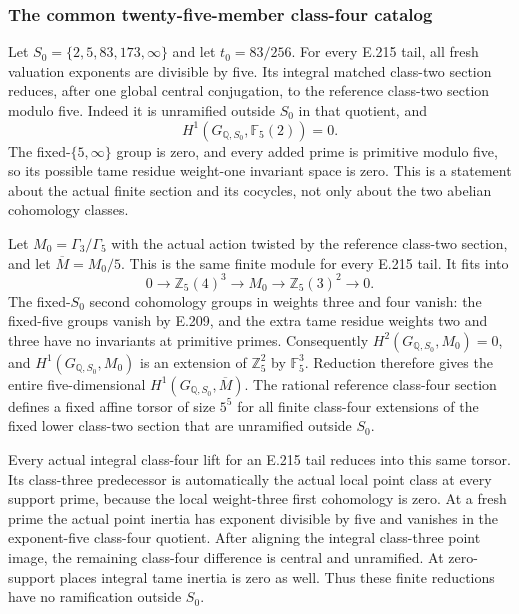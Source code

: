 
\subsubsection*{The common twenty-five-member class-four catalog}
Let $S_0=\{2,5,83,173,\infty\}$ and let $t_0=83/256$.
For every E.215 tail, all fresh valuation exponents are divisible by five.
Its integral matched class-two section reduces, after one global central
conjugation, to the reference class-two section modulo five. Indeed it is
unramified outside $S_0$ in that quotient, and
\[
                 H^1(G_{\mathbb Q,S_0},\mathbb F_5(2))=0.
\]
The fixed-$\{5,\infty\}$ group is zero, and every added prime is
primitive modulo five, so its possible tame residue weight-one invariant
space is zero. This is a statement about the actual finite section and
its cocycles, not only about the two abelian cohomology classes.

Let $M_0=\Gamma_3/\Gamma_5$ with the actual action twisted by the
reference class-two section, and let $\overline M=M_0/5$. This is the same
finite module for every E.215 tail. It fits into
\[
 0\longrightarrow\mathbb Z_5(4)^3\longrightarrow M_0
 \longrightarrow\mathbb Z_5(3)^2\longrightarrow0.
\]
The fixed-$S_0$ second cohomology groups in weights three and four vanish:
the fixed-five groups vanish by E.209, and the extra tame residue weights
two and three have no invariants at primitive primes. Consequently
$H^2(G_{\mathbb Q,S_0},M_0)=0$, and
$H^1(G_{\mathbb Q,S_0},M_0)$ is an extension of $\mathbb Z_5^2$ by
$\mathbb F_5^3$. Reduction therefore gives the entire five-dimensional
$H^1(G_{\mathbb Q,S_0},\overline M)$. The rational reference class-four
section defines a fixed affine torsor of size $5^5$ for all finite
class-four extensions of the fixed lower class-two section that are
unramified outside $S_0$.

Every actual integral class-four lift for an E.215 tail reduces into
this same torsor. Its class-three predecessor is automatically the
actual local point class at every support prime, because the local
weight-three first cohomology is zero. At a fresh prime the actual point
inertia has exponent divisible by five and vanishes in the exponent-five
class-four quotient. After aligning the integral class-three point image,
the remaining class-four difference is central and unramified. At
zero-support places integral tame inertia is zero as well. Thus these
finite reductions have no ramification outside $S_0$.

